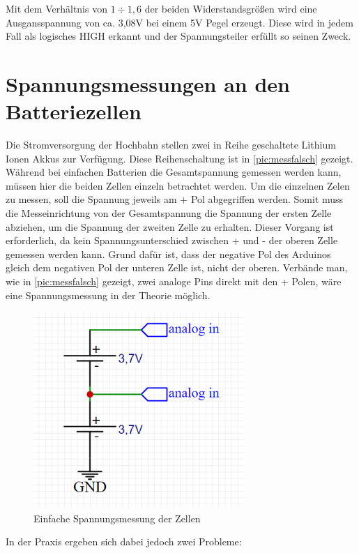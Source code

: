 Mit dem Verhältnis von $1 \div 1,6$ der beiden Widerstandsgrößen wird eine Ausgansspannung von ca. 3,08V bei einem 5V Pegel erzeugt. Diese wird in jedem Fall als logisches HIGH erkannt und der Spannungsteiler erfüllt so seinen Zweck.

\section{Spannungsmessungen an den Batteriezellen}
\label{sec:mess}
Die Stromversorgung der Hochbahn stellen zwei in Reihe geschaltete Lithium Ionen Akkus zur Verfügung. Diese Reihenschaltung ist in \autoref{pic:messfalsch} gezeigt. Während bei einfachen Batterien die Gesamtspannung gemessen werden kann, müssen hier die beiden Zellen einzeln betrachtet werden.
Um die einzelnen Zelen zu messen, soll die Spannung jeweils am + Pol abgegriffen werden. Somit muss die Messeinrichtung von der Gesamtspannung die Spannung der ersten Zelle abziehen, um die Spannung der zweiten Zelle zu erhalten. Dieser Vorgang ist erforderlich, da kein Spannungsunterschied zwischen + und - der oberen Zelle gemessen werden kann. Grund dafür ist, dass der negative Pol des Arduinos gleich dem negativen Pol der unteren Zelle ist, nicht der oberen.
\newpage Verbände man, wie in \autoref{pic:messfalsch} gezeigt, zwei analoge Pins direkt mit den + Polen, wäre eine Spannungsmessung in der Theorie möglich.

\begin{figure}[h]
	\begin{center}
		\includegraphics[width=8cm]{wrongMeasure.PNG}
		\caption{\label{pic:messfalsch} Einfache Spannungsmessung der Zellen}
	\end{center}
\end{figure}

In der Praxis ergeben sich dabei jedoch zwei Probleme:


